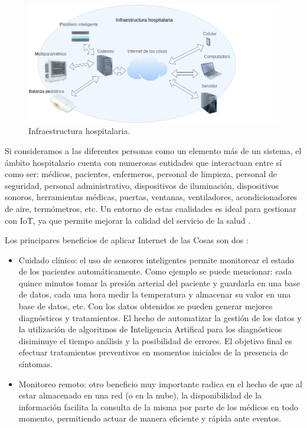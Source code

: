 \begin{figure}[ht]
	\centering
	\includegraphics[scale=.45]{./Figures/InfraestructuraHospi.png}
	\caption{Infraestructura hospitalaria.}
	\label{fig:Infraestructura Hospitalaria}
\end{figure}



Si consideramos a las diferentes personas como un elemento más de un sistema, el ámbito hospitalario cuenta con numerosas entidades que interactuan entre sí como ser: médicos, pacientes, enfermeros, personal de limpieza, personal de seguridad, personal administrativo, dispositivos de iluminación, dispositivos   sonoros, herramientas médicas, puertas, ventanas, ventiladores, acondicionadores de aire, termómetros, etc. Un entorno de estas cualidades es ideal para gestionar con IoT, ya que permite mejorar la calidad del servicio de la salud \citep{ARTICLE:1}.


Los principares beneficios de aplicar Internet de las Cosas son dos \citep{ARTICLE:1}:
\begin{itemize}
\item Cuidado clínico: el uso de sensores inteligentes permite monitorear el estado de los pacientes automáticamente. Como ejemplo se puede mencionar: cada quince minutos tomar la presión arterial del paciente y guardarla en una base de datos, cada una hora medir la temperatura y almacenar su valor en una base de datos, etc. Con los datos obtenidos se pueden generar mejores diagnósticos y tratamientos. El hecho de automatizar la gestión de los datos y la utilización de algoritmos de Inteligencia Artifical para los diagnósticos disiminuye el tiempo análisis y la posibilidad de errores. El objetivo final es  efectuar tratamientos preventivos en momentos iniciales de la presencia de síntomas.
\item Monitoreo remoto: otro beneficio muy importante radica en el hecho de que al estar almacenado en una red (o en la nube), la disponibilidad de la información facilita la consulta de la misma por parte de los médicos en todo momento, permitiendo actuar de manera eficiente y rápida ante eventos.
\end{itemize}



